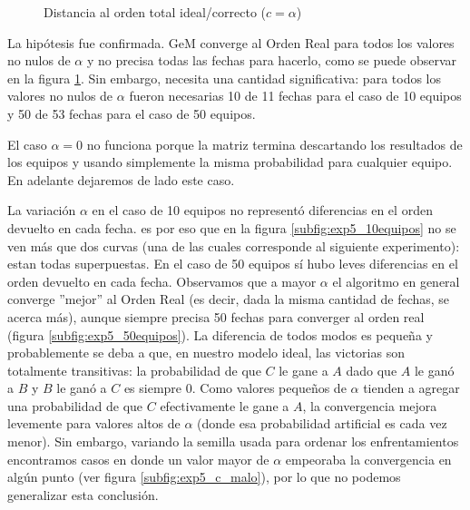 \begin{figure}[H]
    \centering
    \caption{Distancia al orden total ideal/correcto ($c = \alpha$)}
    \label{fig:exp5_1}
\end{figure}

\par La hip\'otesis fue confirmada. GeM converge al Orden Real para todos los
valores no nulos de $\alpha$ y no precisa todas las fechas para hacerlo, como se
puede observar en la figura \ref{fig:exp5_1}. Sin embargo, necesita una cantidad
significativa: para todos los valores no nulos de $\alpha$ fueron necesarias 10
de 11 fechas para el caso de 10 equipos y 50 de 53 fechas para el caso de 50
equipos.

\par El caso $\alpha=0$ no funciona porque la matriz termina descartando los
resultados de los equipos y usando simplemente la misma probabilidad para
cualquier equipo. En adelante dejaremos de lado este caso.

\par La variaci\'on $\alpha$ en el caso de 10 equipos no represent\'o
diferencias en el orden devuelto en cada fecha. es por eso que en la figura
\ref{subfig:exp5_10equipos} no se ven m\'as que dos curvas (una de las cuales
corresponde al siguiente experimento): estan todas superpuestas. En el caso de
50 equipos s\'i hubo leves diferencias en el orden devuelto en cada fecha.
Observamos que a mayor $\alpha$ el algoritmo en general converge ''mejor'' al
Orden Real (es decir, dada la misma cantidad de fechas, se acerca m\'as), aunque
siempre precisa 50 fechas para converger al orden real (figura
\ref{subfig:exp5_50equipos}). La diferencia de todos modos es peque\~na y probablemente se deba a que, en
nuestro modelo ideal, las victorias son totalmente transitivas: la probabilidad
de que $C$ le gane a $A$ dado que $A$ le gan\'o a $B$ y $B$ le ganó a $C$ es
siempre $0$.  Como valores peque\~nos de $\alpha$ tienden a agregar una
probabilidad de que $C$ efectivamente le gane a $A$, la convergencia mejora
levemente para valores altos de $\alpha$ (donde esa probabilidad artificial es
cada vez menor). Sin embargo, variando la semilla usada para ordenar los
enfrentamientos encontramos casos en donde un valor mayor de $\alpha$ empeoraba
la convergencia en alg\'un punto (ver figura \ref{subfig:exp5_c_malo}), por lo
que no podemos generalizar esta conclusi\'on.


